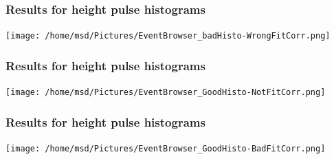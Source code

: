 \documentclass[aspectratio=169]{beamer}
\begin{document}
\begin{frame}
  \frametitle{Results for height pulse histograms}

  \begin{center}
    \texttt{[image: /home/msd/Pictures/EventBrowser\_badHisto-WrongFitCorr.png]}
  \end{center}
\end{frame}


\begin{frame}
  \frametitle{Results for height pulse histograms}

  \begin{center}
    \texttt{[image: /home/msd/Pictures/EventBrowser\_GoodHisto-NotFitCorr.png]}
  \end{center}
\end{frame}


\begin{frame}
  \frametitle{Results for height pulse histograms}

  \begin{center}
    \texttt{[image: /home/msd/Pictures/EventBrowser\_GoodHisto-BadFitCorr.png]}
  \end{center}

\end{frame}
\end{document}

